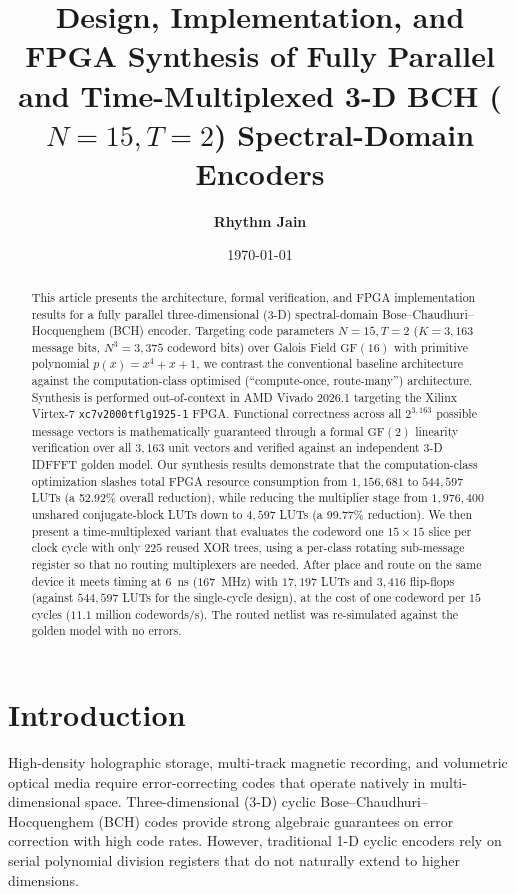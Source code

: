 \documentclass[11pt,a4paper]{article}
\title{\textbf{Design, Implementation, and FPGA Synthesis of Fully Parallel and Time-Multiplexed 3-D BCH ($N=15, T=2$) Spectral-Domain Encoders}}
\author{\textbf{Rhythm Jain}}
\date{\today}
\begin{document}
\maketitle

\begin{abstract}
This article presents the architecture, formal verification, and FPGA implementation results for a fully parallel three-dimensional (3-D) spectral-domain Bose--Chaudhuri--Hocquenghem (BCH) encoder. Targeting code parameters $N=15, T=2$ ($K=3,163$ message bits, $N^3=3,375$ codeword bits) over Galois Field $\text{GF}(16)$ with primitive polynomial $p(x) = x^4 + x + 1$, we contrast the conventional baseline architecture against the computation-class optimised (``compute-once, route-many'') architecture. Synthesis is performed out-of-context in AMD Vivado 2026.1 targeting the Xilinx Virtex-7 \texttt{xc7v2000tflg1925-1} FPGA. Functional correctness across all $2^{3,163}$ possible message vectors is mathematically guaranteed through a formal $\text{GF}(2)$ linearity verification over all $3,163$ unit vectors and verified against an independent 3-D IDFFFT golden model. Our synthesis results demonstrate that the computation-class optimization slashes total FPGA resource consumption from $1,156,681$ to $544,597$ LUTs (a 52.92\% overall reduction), while reducing the multiplier stage from $1,976,400$ unshared conjugate-block LUTs down to $4,597$ LUTs (a 99.77\% reduction). We then present a time-multiplexed variant that evaluates the codeword one $15\times15$ slice per clock cycle with only $225$ reused XOR trees, using a per-class rotating sub-message register so that no routing multiplexers are needed. After place and route on the same device it meets timing at 6~ns ($167$~MHz) with $17,197$ LUTs and $3,416$ flip-flops (against $544,597$ LUTs for the single-cycle design), at the cost of one codeword per $15$ cycles ($11.1$ million codewords/s). The routed netlist was re-simulated against the golden model with no errors.
\end{abstract}

\section{Introduction}

High-density holographic storage, multi-track magnetic recording, and volumetric optical media require error-correcting codes that operate natively in multi-dimensional space. Three-dimensional (3-D) cyclic Bose--Chaudhuri--Hocquenghem (BCH) codes provide strong algebraic guarantees on error correction with high code rates. However, traditional 1-D cyclic encoders rely on serial polynomial division registers that do not naturally extend to higher dimensions.
\end{document}
